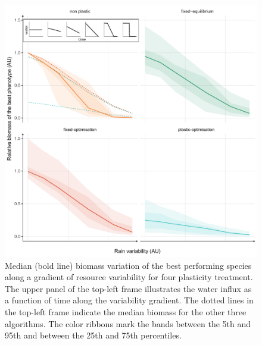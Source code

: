 \begin{figure}
\includegraphics[width = \textwidth]{./2_PP/Figures/Variable/var_relnone_BM_trend.pdf}
\caption[Biomass variations along a gradient of resource variability]{Median (bold line) biomass variation of the best performing species along a gradient of resource variability for four plasticity treatment. The upper panel of the top-left frame illustrates the water influx as a function of time along the variability gradient. The dotted lines in the top-left frame indicate the median biomass for the other three algorithms. The color ribbons mark the bands between the 5th and 95th and between the 25th and 75th percentiles. }\label{fig:variable_BM}
\end{figure}

%

